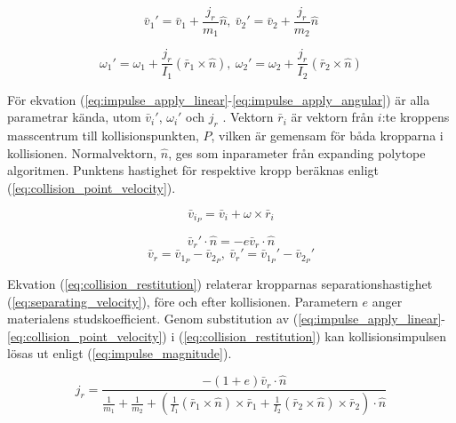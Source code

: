 \documentclass[a4paper,12pt,twopage,swedish]{article}
\begin{document}
\begin{equation}\label{eq:impulse_apply_linear}
\bar{v}_1' = \bar{v}_1 + \frac{j_r}{m_1}\hat{n}, \ \bar{v}_2' = \bar{v}_2 + \frac{j_r}{m_2}\hat{n}
\end{equation}

\begin{equation}\label{eq:impulse_apply_angular}
\omega_1' = \omega_1 + \frac{j_r}{I_1}(\bar{r}_1 \times \hat{n}), \ \omega_2' = \omega_2 + \frac{j_r}{I_2}(\bar{r}_2 \times \hat{n})
\end{equation}

För ekvation (\ref{eq:impulse_apply_linear}-\ref{eq:impulse_apply_angular}) är alla parametrar kända, utom $\bar{v}_i'$, $\omega_i'$ och $j_r$ . Vektorn $\bar{r}_i$ är vektorn från $i$:te kroppens masscentrum till kollisionspunkten, $P$, vilken är gemensam för båda kropparna i kollisionen. Normalvektorn, $\hat{n}$, ges som inparameter från expanding polytope algoritmen. Punktens hastighet för respektive kropp beräknas enligt (\ref{eq:collision_point_velocity}).

\begin{equation}\label{eq:collision_point_velocity}
\bar{v}_{i_P} = \bar{v}_i + \omega \times \bar{r}_i
\end{equation}

\begin{equation}\label{eq:collision_restitution}
\bar{v}_r' \cdot \hat{n} = -e\bar{v}_r \cdot \hat{n}
\end{equation}
\begin{equation}\label{eq:separating_velocity}
\bar{v}_r = \bar{v}_{1_P} - \bar{v}_{2_P}, \ \bar{v}_r' = \bar{v}_{1_P}' - \bar{v}_{2_P}'
\end{equation}

Ekvation (\ref{eq:collision_restitution}) relaterar kropparnas separationshastighet (\ref{eq:separating_velocity}), före och efter kollisionen. Parametern $e$ anger materialens studskoefficient. Genom substitution av (\ref{eq:impulse_apply_linear}-\ref{eq:collision_point_velocity}) i (\ref{eq:collision_restitution}) kan kollisionsimpulsen lösas ut enligt (\ref{eq:impulse_magnitude}).

\begin{equation}\label{eq:impulse_magnitude}
j_r = \frac{-(1+e)\bar{v}_r \cdot \hat{n}}
{\frac{1}{m_1}+\frac{1}{m_2}+(\frac{1}{I_1}(\bar{r}_1 \times \hat{n}) \times \bar{r}_1+\frac{1}{I_2}(\bar{r}_2 \times \hat{n}) \times \bar{r}_2)\cdot \hat{n}}
\end{equation}
\end{document}

